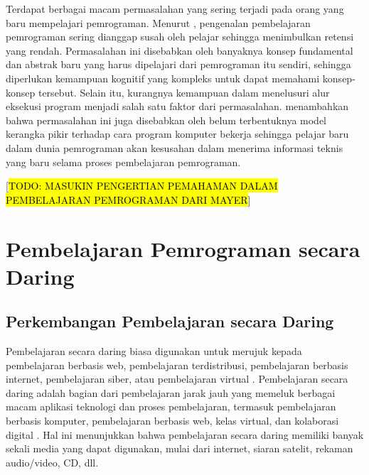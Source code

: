 Terdapat berbagai macam permasalahan yang sering terjadi pada orang yang baru mempelajari pemrograman. Menurut \textcite{moons2013pilot}, pengenalan pembelajaran pemrograman sering dianggap susah oleh pelajar sehingga menimbulkan retensi yang rendah. Permasalahan ini disebabkan oleh banyaknya konsep fundamental dan abstrak baru yang harus dipelajari dari pemrograman itu sendiri, sehingga diperlukan kemampuan kognitif yang kompleks untuk dapat memahami konsep-konsep tersebut. Selain itu, kurangnya kemampuan dalam menelusuri alur eksekusi program menjadi salah satu faktor dari permasalahan.\textcite{mayer1981psychology} menambahkan bahwa permasalahan ini juga disebabkan oleh belum terbentuknya model kerangka pikir terhadap cara program komputer bekerja sehingga pelajar baru dalam dunia pemrograman akan kesusahan dalam menerima informasi teknis yang baru selama proses pembelajaran pemrograman.

  [\hl{TODO: MASUKIN PENGERTIAN PEMAHAMAN DALAM PEMBELAJARAN PEMROGRAMAN DARI MAYER}]


\section{Pembelajaran Pemrograman secara Daring}
\subsection{Perkembangan Pembelajaran secara Daring}
Pembelajaran secara daring biasa digunakan untuk merujuk kepada pembelajaran berbasis web, pembelajaran terdistribusi, pembelajaran berbasis internet, pembelajaran siber, atau pembelajaran virtual \parencite{urdan2000elearning}. Pembelajaran secara daring adalah bagian dari pembelajaran jarak jauh yang memeluk berbagai macam aplikasi teknologi dan proses pembelajaran, termasuk pembelajaran berbasis komputer, pembelajaran berbasis web, kelas virtual, dan kolaborasi digital \parencite{urdan2000elearning}. Hal ini menunjukkan bahwa pembelajaran secara daring memiliki banyak sekali media yang dapat digunakan, mulai dari internet, siaran satelit, rekaman audio/video, CD, dll.


